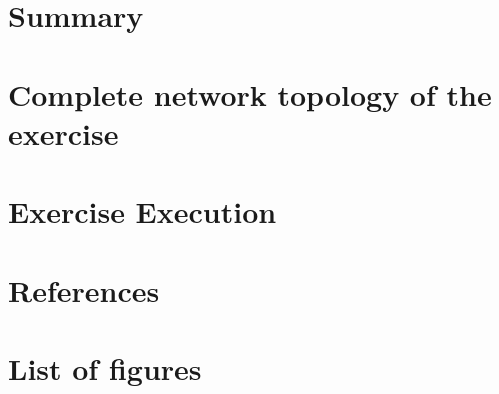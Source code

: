 \documentclass[a4paper]{article}
\begin{document}
\section{Summary}

\newpage

\section{Complete network topology of the exercise}

\newpage

\section{Exercise Execution}


\newpage
\section{References}

\newpage
\section{List of figures}

\listoffigures
\end{document}

